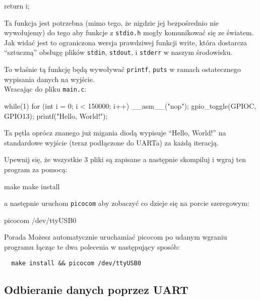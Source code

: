 \documentclass{pdfBooklets}
\begin{document}
\begin{CodeFrame*}[c]{}
  return i;
\end{CodeFrame*}

Ta funkcja jest potrzebna (mimo tego, że nigdzie jej bezpośrednio nie wywołujemy) do tego aby funkcje z \Verb$stdio.h$ mogły komunikować się ze światem.
Jak widać jest to ograniczona wersja prawdziwej funkcji write, która dostarcza ``sztuczną'' obsługę plików \Verb$stdin$, \Verb$stdout$, i \Verb$stderr$
w naszym środowisku. 

To właśnie tą funkcję będą wywoływać \Verb$printf$, \Verb$puts$ w ramach ostatecznego wypisania danych na wyjście.
\\

Wracając do pliku \Verb$main.c$:

\begin{CodeFrame*}[c]{}
  while(1){
    for (int i = 0; i < 150000; i++) __asm__("nop");
    gpio_toggle(GPIOC, GPIO13);
    printf("Hello, World!\n");
  }
\end{CodeFrame*}

Ta pętla oprócz znanego już migania diodą wypisuje ``Hello, World!'' na standardowe wyjście (teraz podłączone do UARTa) za każdą iteracją.


Upewnij się, że wszystkie 3 pliki są zapisane a następnie skompiluj i wgraj ten program za pomocą:

\begin{CodeFrame*}[bash]{}
  make
  make install
\end{CodeFrame*}

a następnie uruchom \Verb$picocom$ aby zobaczyć co dzieje się na porcie szeregowym:

\begin{CodeFrame*}[bash]{}
  picocom /dev/ttyUSB0
\end{CodeFrame*}

\begin{ProTip}{Porada}
  Możesz automatycznie uruchamiać picocom po udanym wgraniu programu łącząc te dwa polecenia w następujący sposób:
  \begin{verbatim}
  make install && picocom /dev/ttyUSB0
  \end{verbatim}
\end{ProTip}

\subsection{Odbieranie danych poprzez UART}
\end{document}
